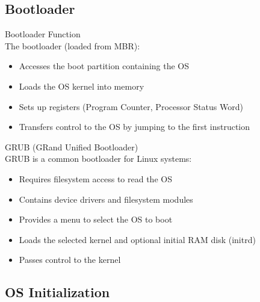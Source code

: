 \subsection{Bootloader}

\begin{definition}{Bootloader Function}\\
    The bootloader (loaded from MBR):
    \begin{itemize}
        \item Accesses the boot partition containing the OS
        \item Loads the OS kernel into memory
        \item Sets up registers (Program Counter, Processor Status Word)
        \item Transfers control to the OS by jumping to the first instruction
    \end{itemize}
\end{definition}

\begin{definition}{GRUB (GRand Unified Bootloader)}\\
    GRUB is a common bootloader for Linux systems:
    \begin{itemize}
        \item Requires filesystem access to read the OS
        \item Contains device drivers and filesystem modules
        \item Provides a menu to select the OS to boot
        \item Loads the selected kernel and optional initial RAM disk (initrd)
        \item Passes control to the kernel
    \end{itemize}
\end{definition}

\subsection{OS Initialization}

